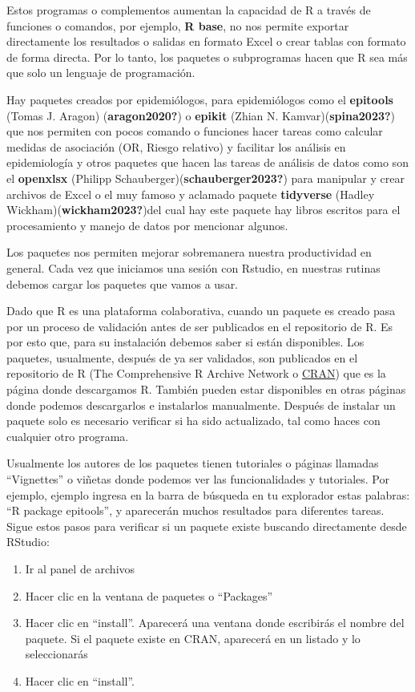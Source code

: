 \documentclass[
  letterpaper,
  DIV=11,
  numbers=noendperiod]{scrreprt}
\providecommand{\tightlist}{%
  \setlength{\itemsep}{0pt}\setlength{\parskip}{0pt}}\usepackage{longtable,booktabs,array}
\begin{document}
Estos programas o complementos aumentan la capacidad de R a través de
funciones o comandos, por ejemplo, \textbf{R base}, no nos permite
exportar directamente los resultados o salidas en formato Excel o crear
tablas con formato de forma directa. Por lo tanto, los paquetes o
subprogramas hacen que R sea más que solo un lenguaje de programación.

Hay paquetes creados por epidemiólogos, para epidemiólogos como el
\textbf{epitools} (Tomas J. Aragon) (\textbf{aragon2020?}) o
\textbf{epikit} (Zhian N. Kamvar)(\textbf{spina2023?}) que nos permiten
con pocos comando o funciones hacer tareas como calcular medidas de
asociación (OR, Riesgo relativo) y facilitar los análisis en
epidemiología y otros paquetes que hacen las tareas de análisis de datos
como son el \textbf{openxlsx} (Philipp
Schauberger)(\textbf{schauberger2023?}) para manipular y crear archivos
de Excel o el muy famoso y aclamado paquete \textbf{tidyverse} (Hadley
Wickham)(\textbf{wickham2023?})del cual hay este paquete hay libros
escritos para el procesamiento y manejo de datos por mencionar algunos.

Los paquetes nos permiten mejorar sobremanera nuestra productividad en
general. Cada vez que iniciamos una sesión con Rstudio, en nuestras
rutinas debemos cargar los paquetes que vamos a usar.

Dado que R es una plataforma colaborativa, cuando un paquete es creado
pasa por un proceso de validación antes de ser publicados en el
repositorio de R. Es por esto que, para su instalación debemos saber si
están disponibles. Los paquetes, usualmente, después de ya ser
validados, son publicados en el repositorio de R (The Comprehensive R
Archive Network o \href{https://cran.r-project.org/web/packages/}{CRAN})
que es la página donde descargamos R. También pueden estar disponibles
en otras páginas donde podemos descargarlos e instalarlos manualmente.
Después de instalar un paquete solo es necesario verificar si ha sido
actualizado, tal como haces con cualquier otro programa.

Usualmente los autores de los paquetes tienen tutoriales o páginas
llamadas ``Vignettes'' o viñetas donde podemos ver las funcionalidades y
tutoriales. Por ejemplo, ejemplo ingresa en la barra de búsqueda en tu
explorador estas palabras: ``R package epitools'', y aparecerán muchos
resultados para diferentes tareas. Sigue estos pasos para verificar si
un paquete existe buscando directamente desde RStudio:

\begin{enumerate}
\def\labelenumi{\arabic{enumi}.}
\tightlist
\item
  Ir al panel de archivos
\item
  Hacer clic en la ventana de paquetes o ``Packages''
\item
  Hacer clic en ``install''. Aparecerá una ventana donde escribirás el
  nombre del paquete. Si el paquete existe en CRAN, aparecerá en un
  listado y lo seleccionarás
\item
  Hacer clic en ``install''.
\end{enumerate}
\end{document}
